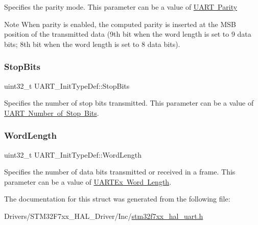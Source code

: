Specifies the parity mode. This parameter can be a value of \mbox{\hyperlink{group___u_a_r_t___parity}{U\+A\+RT Parity}} \begin{DoxyNote}{Note}
When parity is enabled, the computed parity is inserted at the M\+SB position of the transmitted data (9th bit when the word length is set to 9 data bits; 8th bit when the word length is set to 8 data bits). 
\end{DoxyNote}
\mbox{\label{struct_u_a_r_t___init_type_def_a6717dfe595617c7b2d57139d9cd306ef}} 
\subsubsection{\texorpdfstring{StopBits}{StopBits}}
{\footnotesize\ttfamily uint32\+\_\+t U\+A\+R\+T\+\_\+\+Init\+Type\+Def\+::\+Stop\+Bits}

Specifies the number of stop bits transmitted. This parameter can be a value of \mbox{\hyperlink{group___u_a_r_t___stop___bits}{U\+A\+RT Number of Stop Bits}}. \mbox{\label{struct_u_a_r_t___init_type_def_a0f1cd85e62aa4fd4b36ee9e610e7789f}} 
\subsubsection{\texorpdfstring{WordLength}{WordLength}}
{\footnotesize\ttfamily uint32\+\_\+t U\+A\+R\+T\+\_\+\+Init\+Type\+Def\+::\+Word\+Length}

Specifies the number of data bits transmitted or received in a frame. This parameter can be a value of \mbox{\hyperlink{group___u_a_r_t_ex___word___length}{U\+A\+R\+T\+Ex Word Length}}. 

The documentation for this struct was generated from the following file\+:\begin{DoxyCompactItemize}
\item 
Drivers/\+S\+T\+M32\+F7xx\+\_\+\+H\+A\+L\+\_\+\+Driver/\+Inc/\mbox{\hyperlink{stm32f7xx__hal__uart_8h}{stm32f7xx\+\_\+hal\+\_\+uart.\+h}}\end{DoxyCompactItemize}
